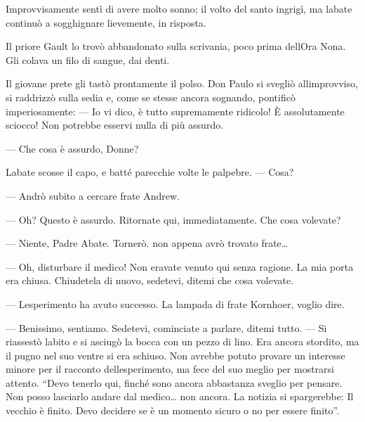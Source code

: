 Improvvisamente sentì di avere molto sonno; il volto del santo ingrigì,
ma l\textquotesingle abate continuò a sogghignare lievemente, in
risposta.

Il priore Gault lo trovò abbandonato sulla scrivania, poco prima
dell\textquotesingle Ora Nona. Gli colava un filo di sangue, dai denti.

Il giovane prete gli tastò prontamente il polso. Don Paulo si svegliò
all\textquotesingle improvviso, si raddrizzò sulla sedia e, come se
stesse ancora sognando, pontificò imperiosamente: --- Io vi dico, è
tutto supremamente ridicolo! È assolutamente sciocco! Non potrebbe
esservi nulla di più assurdo.

--- Che cosa è assurdo, Donne?

L\textquotesingle abate scosse il capo, e batté parecchie volte le
palpebre. --- Cosa?

--- Andrò subito a cercare frate Andrew.

--- Oh? Questo è assurdo. Ritornate qui, immediatamente. Che cosa
volevate?

--- Niente, Padre Abate. Tornerò. non appena avrò trovato frate\ldots{}

--- Oh, disturbare il medico! Non eravate venuto qui senza ragione. La
mia porta era chiusa. Chiudetela di nuovo, sedetevi, ditemi che cosa
volevate.

--- L\textquotesingle esperimento ha avuto successo. La lampada di frate
Kornhoer, voglio dire.

--- Benissimo, sentiamo. Sedetevi, cominciate a parlare, ditemi tutto.
--- Si riassestò l\textquotesingle abito e si asciugò la bocca con un
pezzo di lino. Era ancora stordito, ma il pugno nel suo ventre si era
schiuso. Non avrebbe potuto provare un interesse minore per il racconto
dell\textquotesingle esperimento, ma fece del suo meglio per mostrarsi
attento. ``Devo tenerlo qui, finché sono ancora abbastanza sveglio per
pensare. Non posso lasciarlo andare dal medico\ldots{} non ancora. La
notizia si spargerebbe: Il vecchio è finito. Devo decidere se è un
momento sicuro o no per essere finito''.
